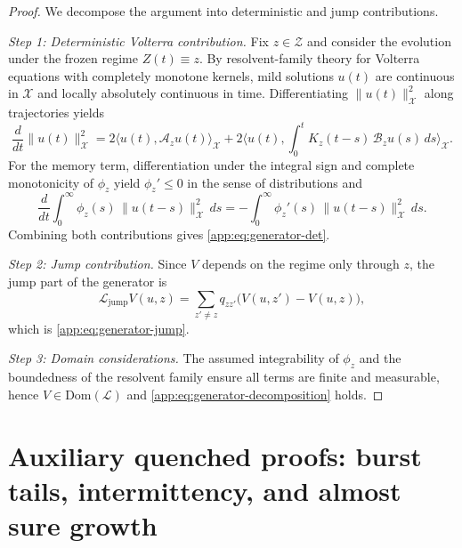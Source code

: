 \documentclass[12pt,a4paper]{article}
\theoremstyle{plain}
\theoremstyle{definition}
\theoremstyle{remark}
\begin{document}
	\begin{proof}
		We decompose the argument into deterministic and jump contributions.
		
		\medskip
		\noindent\emph{Step 1: Deterministic Volterra contribution.}
		Fix $z\in\mathcal{Z}$ and consider the evolution under the frozen regime
		$Z(t)\equiv z$.
		By resolvent-family theory for Volterra equations with completely monotone kernels,
		mild solutions $u(t)$ are continuous in $\mathcal{X}$ and locally absolutely
		continuous in time.
		Differentiating $\|u(t)\|_{\mathcal{X}}^2$ along trajectories yields
		\[
		\frac{d}{dt}\|u(t)\|_{\mathcal{X}}^2
		=
		2\langle u(t),\mathcal{A}_z u(t)\rangle_{\mathcal{X}}
		+
		2\Big\langle
		u(t),
		\int_0^t K_z(t-s)\,\mathcal{B}_z u(s)\,ds
		\Big\rangle_{\mathcal{X}}.
		\]
		For the memory term, differentiation under the integral sign and complete
		monotonicity of $\phi_z$ yield $\phi_z'\le 0$ in the sense of distributions and
		\[
		\frac{d}{dt}
		\int_0^\infty \phi_z(s)\,\|u(t-s)\|_{\mathcal{X}}^2\,ds
		=
		-
		\int_0^\infty \phi_z'(s)\,\|u(t-s)\|_{\mathcal{X}}^2\,ds.
		\]
		Combining both contributions gives \eqref{app:eq:generator-det}.
		
		\medskip
		\noindent\emph{Step 2: Jump contribution.}
		Since $V$ depends on the regime only through $z$, the jump part of the generator is
		\[
		\mathcal{L}_{\mathrm{jump}}V(u,z)
		=
		\sum_{z'\neq z} q_{zz'}\big(V(u,z')-V(u,z)\big),
		\]
		which is \eqref{app:eq:generator-jump}.
		
		\medskip
		\noindent\emph{Step 3: Domain considerations.}
		The assumed integrability of $\phi_z$ and the boundedness of the resolvent family
		ensure all terms are finite and measurable, hence $V\in\mathrm{Dom}(\mathcal L)$ and
		\eqref{app:eq:generator-decomposition} holds.
	\end{proof}
	
	
	\section{Auxiliary quenched proofs: burst tails, intermittency, and almost sure growth}
	\label{app:quenched-proofs}
	
\end{document}

